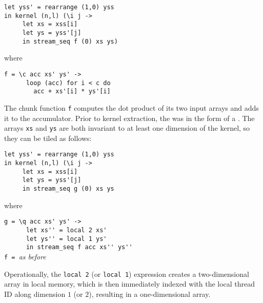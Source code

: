 \begin{lstlisting}
let yss' = rearrange (1,0) yss
in kernel (n,l) (\i j ->
     let xs = xss[i]
     let ys = yss'[j]
     in stream_seq f (0) xs ys)
\end{lstlisting}
\begin{minipage}[t]{0.1\linewidth}
  \begin{flushright}
    where
  \end{flushright}
\end{minipage}
\begin{minipage}[t]{0.8\linewidth}
\lstinline{f = \c acc xs' ys' ->}\\
\lstinline{      loop (acc) for i < c do}\\
\lstinline{        acc + xs'[i] * ys'[i]}
\end{minipage}
\vspace{1em}

The chunk function \lstinline{f} computes the dot product of its two
input arrays and adds it to the accumulator.  Prior to kernel
extraction, the \StreamSeq{} was in the form of a .  The
arrays \lstinline{xs} and \lstinline{ys} are both invariant to at
least one dimension of the kernel, so they can be tiled as follows:

\begin{lstlisting}
let yss' = rearrange (1,0) yss
in kernel (n,l) (\i j ->
     let xs = xss[i]
     let ys = yss'[j]
     in stream_seq g (0) xs ys
\end{lstlisting}
\begin{minipage}[t]{0.1\linewidth}
  \begin{flushright}
    where
  \end{flushright}
\end{minipage}
\begin{minipage}[t]{0.8\linewidth}
\lstinline{g = \q acc xs' ys' ->}\\
\lstinline{      let xs'' = local 2 xs'}\\
\lstinline{      let ys'' = local 1 ys'}\\
\lstinline{      in stream_seq f acc xs'' ys''}\\
\lstinline{f = }\textit{as before}
\end{minipage}
\vspace{1em}

Operationally, the \lstinline{local 2} (or \lstinline{local 1})
expression creates a two-dimensional array in local memory, which is
then immediately indexed with the local thread ID along dimension $1$
(or $2$), resulting in a one-dimensional array.

